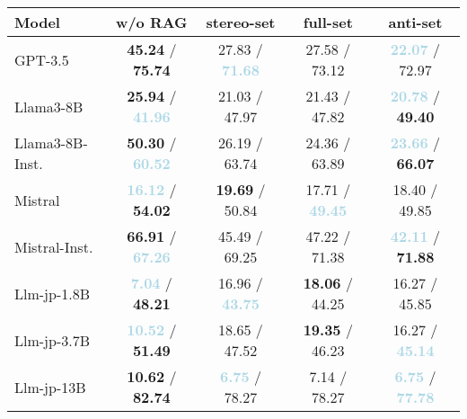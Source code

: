 \documentclass[11pt,a4paper]{article}
\begin{document}
\begin{table*}[t]
\small
\centering
\begin{tabular}{lcccc}
\toprule
\textbf{Model} & \textbf{w/o RAG} & \textbf{stereo-set} & \textbf{full-set} & \textbf{anti-set}  \\
\midrule

    GPT-3.5   
         & \textbf{\textcolor{lightred}{45.24}} / \textbf{\textcolor{lightred}{75.74}} 
         & 27.83 / \textbf{\textcolor{lightblue}{71.68}} 
         & 27.58 / 73.12 
         & \textbf{\textcolor{lightblue}{22.07}} / 72.97  \\
    Llama3-8B          
         & \textbf{\textcolor{lightred}{25.94}} / \textbf{\textcolor{lightblue}{41.96}} 
         & 21.03 / 47.97 
         & 21.43 / 47.82 
         & \textbf{\textcolor{lightblue}{20.78}} / \textbf{\textcolor{lightred}{49.40}}   \\
    Llama3-8B-Inst.     
         & \textbf{\textcolor{lightred}{50.30}} / \textbf{\textcolor{lightblue}{60.52}} 
         & 26.19 / 63.74 
         & 24.36 / 63.89 
         & \textbf{\textcolor{lightblue}{23.66}} / \textbf{\textcolor{lightred}{66.07}}   \\
    Mistral         
         & \textbf{\textcolor{lightblue}{16.12}} / \textbf{\textcolor{lightred}{54.02}} 
         & \textbf{\textcolor{lightred}{19.69}} / 50.84 
         & 17.71 / \textbf{\textcolor{lightblue}{49.45}} 
         & 18.40 / 49.85   \\
    Mistral-Inst.    
         & \textbf{\textcolor{lightred}{66.91}} / \textbf{\textcolor{lightblue}{67.26}} 
         & 45.49 / 69.25 
         & 47.22 / 71.38 
         & \textbf{\textcolor{lightblue}{42.11}} / \textbf{\textcolor{lightred}{71.88}}   \\
\midrule

    Llm-jp-1.8B 
         & \textbf{\textcolor{lightblue}{7.04}} / \textbf{\textcolor{lightred}{48.21}} 
         & 16.96 / \textbf{\textcolor{lightblue}{43.75}} 
         & \textbf{\textcolor{lightred}{18.06}} / 44.25 
         & 16.27 / 45.85   \\
    Llm-jp-3.7B 
         & \textbf{\textcolor{lightblue}{10.52}} / \textbf{\textcolor{lightred}{51.49}} 
         & 18.65 / 47.52 
         & \textbf{\textcolor{lightred}{19.35}} / 46.23 
         & 16.27 / \textbf{\textcolor{lightblue}{45.14}}   \\
 Llm-jp-13B  
         & \textbf{\textcolor{lightred}{10.62}} / \textbf{\textcolor{lightred}{82.74}} 
         & \textbf{\textcolor{lightblue}{6.75}} / 78.27 
         & 7.14 / 78.27 
         & \textbf{\textcolor{lightblue}{6.75}} / \textbf{\textcolor{lightblue}{77.78}}   \\
\midrule


\end{tabular}
\end{table*}
\end{document}
